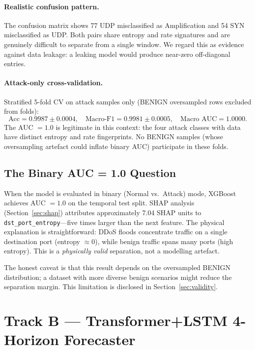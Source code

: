 \paragraph{Realistic confusion pattern.}
The confusion matrix shows 77 UDP misclassified as Amplification
and 54 SYN misclassified as UDP. Both pairs share entropy and rate
signatures and are genuinely difficult to separate from a single window.
We regard this as evidence against data leakage: a leaking model would
produce near-zero off-diagonal entries.

\paragraph{Attack-only cross-validation.}
Stratified 5-fold CV on attack samples only (BENIGN oversampled rows
excluded from folds):
\[
  \text{Acc} = 0.9987 \pm 0.0004,\quad
  \text{Macro-F1} = 0.9981 \pm 0.0005,\quad
  \text{Macro AUC} = 1.0000.
\]
The AUC $= 1.0$ is legitimate in this context: the four attack classes
with data have distinct entropy and rate fingerprints. No BENIGN
samples (whose oversampling artefact could inflate binary AUC)
participate in these folds.

\subsection{The Binary AUC = 1.0 Question}
\label{sec:binary-auc}

When the model is evaluated in binary (Normal vs.\ Attack) mode, XGBoost
achieves AUC $= 1.0$ on the temporal test split. SHAP analysis
(Section~\ref{sec:shap}) attributes approximately 7.04 SHAP units to
\texttt{dst\_port\_entropy}---five times larger than the next feature.
The physical explanation is straightforward: DDoS floods concentrate
traffic on a single destination port (entropy $\approx 0$), while benign
traffic spans many ports (high entropy). This is a \emph{physically
valid} separation, not a modelling artefact.

The honest caveat is that this result depends on the oversampled BENIGN
distribution; a dataset with more diverse benign scenarios might reduce
the separation margin. This limitation is disclosed in
Section~\ref{sec:validity}.

\section{Track B --- Transformer+LSTM 4-Horizon Forecaster}
\label{sec:forecast}

